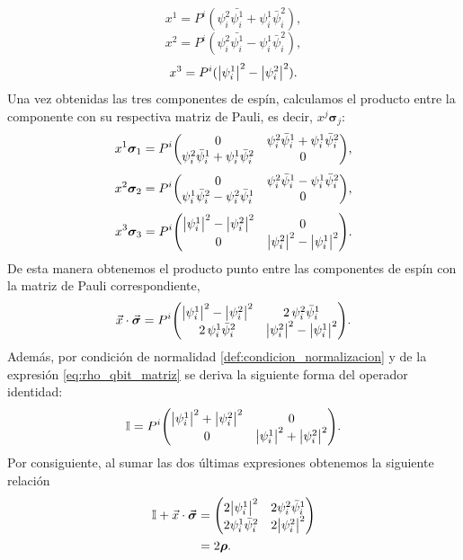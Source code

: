 \documentclass[../Main.tex]{subfiles}
\begin{document}
\begin{equation}
    x^1=P^i(\psi_i^2\bar{\psi_i^1}+\psi_i^1\bar{\psi}_i^2),
\end{equation}
\begin{equation}
    x^2=P^i(\psi_i^2\bar{\psi_i^1}-\psi_i^1\bar{\psi}_i^2),
\end{equation}
\begin{equation}
    x^3=P^i(\abs{\psi_i^1}^2-\abs{\psi_i^2}^2).
\end{equation}
Una vez obtenidas las tres componentes de espín, calculamos el producto entre la componente con su respectiva matriz de Pauli, es decir, $x^j\bm{\sigma}_j$:
\begin{equation}
    x^1\bm{\sigma}_1=P^i\mqty(0&\psi_i^2\bar{\psi}_i^1+\psi_i^1\bar{\psi}_i^2\\\psi_i^2\bar{\psi}_i^1+\psi_i^1\bar{\psi}_i^2&0),
\end{equation}
\begin{equation}
    x^2\bm{\sigma}_2=P^i\mqty(0&\psi_i^2\bar{\psi}_i^1-\psi_i^1\bar{\psi}_i^2\\\psi_i^1\bar{\psi}_i^2-\psi_i^2\bar{\psi}_i^1&0),
\end{equation}
\begin{equation}
    x^3\bm{\sigma}_3=P^i\mqty(\abs{\psi_i^1}^2-\abs{\psi_i^2}^2&0\\0&\abs{\psi_i^2}^2-\abs{\psi_i^1}^2).
\end{equation}
De esta manera obtenemos el producto punto entre las componentes de espín con la matriz de Pauli correspondiente, 
\begin{equation}
    \vec{x}\cdot\vec{\bm{\sigma}}=P^i\mqty(\abs{\psi_i^1}^2-\abs{\psi_i^2}^2&2\,\psi_i^2\bar{\psi}_i^1\\2\,\psi_i^1\bar{\psi}_i^2&\abs{\psi_i^2}^2-\abs{\psi_i^1}^2).
\end{equation}
Además, por condición de normalidad \eqref{def:condicion_normalizacion} y de la expresión \eqref{eq:rho_qbit_matriz} se deriva la siguiente forma del operador identidad:
\begin{equation}
    \Id=P^i \mqty(\abs{\psi_i^1}^2+\abs{\psi_i^2}^2&0\\0&\abs{\psi_i^1}^2+\abs{\psi_i^2}^2).
\end{equation}
Por consiguiente, al sumar las dos últimas expresiones obtenemos la siguiente relación
\begin{align}
    \Id+\vec{x}\cdot\vec{\bm{\sigma}}
    &=\mqty(2\abs{\psi_i^1}^2&2\psi_i^2\bar{\psi}_i^1\\2\psi_i^1\bar{\psi}_i^2&2\abs{\psi_i^2}^2)\notag\\
    &=2\rhon.
\end{align}
\end{document}
